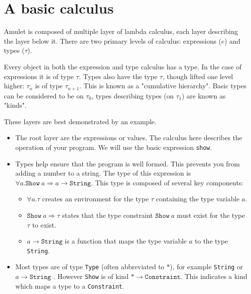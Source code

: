 \section{A basic calculus}
Amulet is composed of multiple layer of lambda calculus, each layer describing the layer below it. There are two primary levels of calculus: expressions ($e$) and types ($\tau$).

Every object in both the expression and type calculus has a type. In the case of expressions it is of type $\tau$. Types also have the type $\tau$, though lifted one level higher: $\tau_n$ is of type $\tau_{n+1}$. This is known as a "cumulative hierarchy". Basic types can be considered to be on $\tau_0$, types describing types (on $\tau_1$) are known as "kinds".

These layers are best demonstrated by an example.
\begin{itemize}
\item The root layer are the expressions or values. The calculus here describes the operation of your program. We will use the basic expression \texttt{show}.
\item Types help ensure that the program is well formed. This prevents you from adding a number to a string. The type of this expression is $\forall a . \mathtt{Show}\ a \Rightarrow a \to \mathtt{String}$. This type is composed of several key components: 
\begin{itemize}
\item $\forall a . \tau$ creates an environment for the type $\tau$ containing the type variable $a$.
\item $\mathtt{Show}\ a \Rightarrow \tau$ states that the type constraint $\mathtt{Show}\ a$  must exist for the type $\tau$ to exist.
\item $a \rightarrow \mathtt{String}$ is a function that maps the type variable $a$ to the type \texttt{String}. 
\end{itemize}
\item Most types are of type \texttt{Type} (often abbreviated to $*$), for example \texttt{String} or $a \to \mathtt{String}$ . However \texttt{Show} is of kind $* \to\mathtt{Constraint}$. This indicates a kind which maps a type to a \texttt{Constraint}.
\end{itemize}

